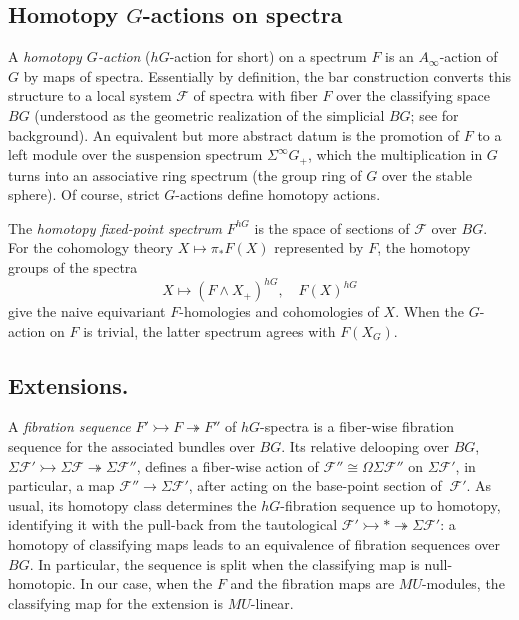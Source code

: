 \documentclass[11pt, reqno]{amsart}
\theoremstyle{plain}
\theoremstyle{definition}
\begin{document}
\subsection{Homotopy $G$-actions on spectra}
A \emph{homotopy $G$-action}  ($hG$-action for short) on a spectrum $F$  is an $A_\infty$-action 
of $G$ by maps of spectra. Essentially by definition, the bar construction converts this structure 
to a local system $\mathcal{F}$ of spectra with fiber $F$ over the classifying space $BG$ (understood as the 
geometric realization of the simplicial $BG$; see \cite{segal} for background). An equivalent 
but more abstract datum is the promotion of $F$ to a left module over the suspension spectrum 
$\Sigma^\infty G_+$, which the multiplication in $G$ turns into an associative ring spectrum 
(the group ring of $G$ over the stable sphere). Of course, strict $G$-actions define  homotopy 
actions. 

The \emph{homotopy fixed-point spectrum} $F^{hG}$ is the space of sections of $\mathcal{F}$ over $BG$. 
For the cohomology theory $X\mapsto \pi_*F(X)$ represented by $F$, 
the homotopy groups of the spectra 
\[
X\mapsto \left(F\wedge X_+\right)^{hG}, \quad 
	F\left(X\right)^{hG}
\]
give the naive equivariant $F$-homologies and cohomologies of $X$. When the $G$-action on $F$ is trivial, 
the latter spectrum agrees with $F(X_G)$. 

\subsection{Extensions.} 
A \emph{fibration sequence} $F' \rightarrowtail F \twoheadrightarrow F''$ of $hG$-spectra is 
a fiber-wise fibration sequence for the associated bundles over $BG$. Its relative delooping over $BG$, 
$\Sigma \mathcal{F}' \rightarrowtail \Sigma \mathcal{F} \twoheadrightarrow \Sigma \mathcal{F}''$, 
defines a fiber-wise action of $\mathcal{F}'' \cong \Omega\Sigma \mathcal{F}''$ on $\Sigma \mathcal{F}'$, 
in particular, a map $\mathcal{F}''\to \Sigma \mathcal{F}'$, after acting on the base-point section of 
$\ \mathcal{F}'$. As usual, its homotopy class determines the $hG$-fibration sequence up to homotopy, 
identifying it with the pull-back from the tautological $\mathcal{F}' \rightarrowtail * \twoheadrightarrow \Sigma \mathcal{F}'$: a homotopy of classifying maps leads to an equivalence of fibration sequences over $BG$. 
In particular, the sequence is split when the classifying map is null-homotopic.
In our case, when the $F$ and the fibration maps are $MU$-modules, the classifying map for the extension
is  $MU$-linear. 
\end{document}
